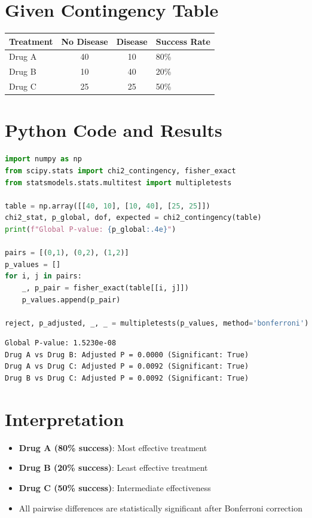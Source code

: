 \documentclass[12pt, a4paper]{article}
\begin{document}
\section*{Given Contingency Table}
\begin{center}
\begin{tabular}{lcc}
\toprule
\textbf{Treatment} & \textbf{No Disease} & \textbf{Disease} & \textbf{Success Rate} \\
\midrule
Drug A & 40 & 10 & 80\% \\
Drug B & 10 & 40 & 20\% \\
Drug C & 25 & 25 & 50\% \\
\bottomrule
\end{tabular}
\end{center}

\section*{Python Code and Results}

\begin{lstlisting}[language=Python]
import numpy as np
from scipy.stats import chi2_contingency, fisher_exact
from statsmodels.stats.multitest import multipletests

table = np.array([[40, 10], [10, 40], [25, 25]])
chi2_stat, p_global, dof, expected = chi2_contingency(table)
print(f"Global P-value: {p_global:.4e}")

pairs = [(0,1), (0,2), (1,2)]
p_values = []
for i, j in pairs:
    _, p_pair = fisher_exact(table[[i, j]])
    p_values.append(p_pair)

reject, p_adjusted, _, _ = multipletests(p_values, method='bonferroni')
\end{lstlisting}

\begin{outputbox}
\begin{verbatim}
Global P-value: 1.5230e-08
Drug A vs Drug B: Adjusted P = 0.0000 (Significant: True)
Drug A vs Drug C: Adjusted P = 0.0092 (Significant: True)
Drug B vs Drug C: Adjusted P = 0.0092 (Significant: True)
\end{verbatim}
\end{outputbox}

\section*{Interpretation}
\begin{itemize}
    \item \textbf{Drug A (80\% success)}: Most effective treatment
    \item \textbf{Drug B (20\% success)}: Least effective treatment
    \item \textbf{Drug C (50\% success)}: Intermediate effectiveness
    \item All pairwise differences are statistically significant after Bonferroni correction
\end{itemize}
\end{document}

